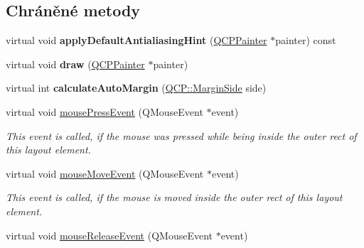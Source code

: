 \subsection*{Chráněné metody}
\begin{DoxyCompactItemize}
\item 
\hypertarget{classQCPAxisRect_a9a6dd0763701cbc7d01f899bcbb3f9ca}{}virtual void {\bfseries apply\+Default\+Antialiasing\+Hint} (\hyperlink{classQCPPainter}{Q\+C\+P\+Painter} $\ast$painter) const \label{classQCPAxisRect_a9a6dd0763701cbc7d01f899bcbb3f9ca}

\item 
\hypertarget{classQCPAxisRect_afb1bbbbda8345cd2710d92ee48440b53}{}virtual void {\bfseries draw} (\hyperlink{classQCPPainter}{Q\+C\+P\+Painter} $\ast$painter)\label{classQCPAxisRect_afb1bbbbda8345cd2710d92ee48440b53}

\item 
\hypertarget{classQCPAxisRect_ae79f18302e6507586aa8c032a5f9ed1c}{}virtual int {\bfseries calculate\+Auto\+Margin} (\hyperlink{namespaceQCP_a7e487e3e2ccb62ab7771065bab7cae54}{Q\+C\+P\+::\+Margin\+Side} side)\label{classQCPAxisRect_ae79f18302e6507586aa8c032a5f9ed1c}

\item 
\hypertarget{classQCPAxisRect_a77501dbeccdac7256f7979b05077c04e}{}virtual void \hyperlink{classQCPAxisRect_a77501dbeccdac7256f7979b05077c04e}{mouse\+Press\+Event} (Q\+Mouse\+Event $\ast$event)\label{classQCPAxisRect_a77501dbeccdac7256f7979b05077c04e}

\begin{DoxyCompactList}\small\item\em This event is called, if the mouse was pressed while being inside the outer rect of this layout element. \end{DoxyCompactList}\item 
\hypertarget{classQCPAxisRect_a4baf3d5dd69166788f6ceda0ea182c6e}{}virtual void \hyperlink{classQCPAxisRect_a4baf3d5dd69166788f6ceda0ea182c6e}{mouse\+Move\+Event} (Q\+Mouse\+Event $\ast$event)\label{classQCPAxisRect_a4baf3d5dd69166788f6ceda0ea182c6e}

\begin{DoxyCompactList}\small\item\em This event is called, if the mouse is moved inside the outer rect of this layout element. \end{DoxyCompactList}\item 
\hypertarget{classQCPAxisRect_adf6c99780cea55ab39459a6eaad3a94a}{}virtual void \hyperlink{classQCPAxisRect_adf6c99780cea55ab39459a6eaad3a94a}{mouse\+Release\+Event} (Q\+Mouse\+Event $\ast$event)\label{classQCPAxisRect_adf6c99780cea55ab39459a6eaad3a94a}


\end{DoxyCompactItemize}
